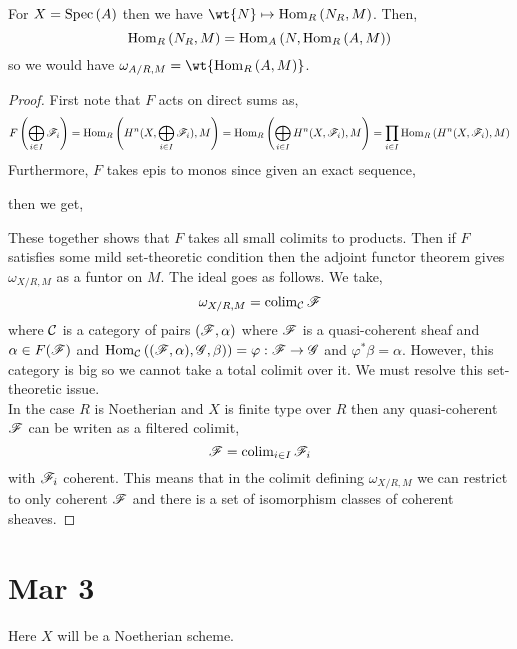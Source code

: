 \documentclass[12pt]{article}
\begin{document}
\begin{example}
For $X = \mathrm{Spec}\left( A \right)$ then we have $\wt{N} \mapsto \Hom{R}{N_R}{M}$. Then,
\[ \mathrm{Hom}_{R} \left( N_R, M \right) = \mathrm{Hom}_{A} \left( N, \mathrm{Hom}_{R} \left( A, M \right) \right) \]
so we would have $\omega_{A/R,M} = \wt{\Hom{R}{A}{M}}$. 
\end{example}

\begin{proof}
First note that $F$ acts on direct sums as,
\[ F \left( \bigoplus_{i \in I} \mathscr{F}_i \right) = \mathrm{Hom}_{R} \left( H^n(X, \bigoplus_{i \in I} \mathscr{F}_i), M \right) = \mathrm{Hom}_{R} \left( \bigoplus_{i \in I} H^n(X, \mathscr{F}_i), M \right) = \prod_{i \in I} \mathrm{Hom}_{R} \left( H^n(X, \mathscr{F}_i), M \right) \]
Furthermore, $F$ takes epis to monos since given an exact sequence,
\begin{center}
\end{center}
then we get,
\begin{center}
\end{center}
These together shows that $F$ takes all small colimits to products. Then if $F$ satisfies some mild set-theoretic condition then the adjoint functor theorem gives $\omega_{X/R, M}$ as a funtor on $M$. The ideal goes as follows. We take,
\[ \omega_{X/R,M} = \operatorname{\mathrm{colim}}_{\mathcal{C}} \mathscr{F} \]
where $\mathcal{C}$ is a category of pairs $(\mathscr{F}, \alpha)$ where $\mathscr{F}$ is a quasi-coherent sheaf and $\alpha \in F(\mathscr{F})$ and $\mathrm{Hom}_{\mathcal{C}} \left( (\mathscr{F}, \alpha), \mathscr{G}, \beta) \right) = \varphi : \mathscr{F} \to \mathscr{G}$ and $\varphi^* \beta = \alpha$. However, this category is big so we cannot take a total colimit over it. We must resolve this set-theoretic issue. 
\bigskip\\
In the case $R$ is Noetherian and $X$ is finite type over $R$ then any quasi-coherent $\mathscr{F}$ can be writen as a filtered colimit,
\[ \mathscr{F} = \operatorname{\mathrm{colim}}_{i \in I} \mathscr{F}_i \]
with $\mathscr{F}_i$ coherent. This means that in the colimit defining $\omega_{X/R,M}$ we can restrict to only coherent $\mathscr{F}$ and there is a set of isomorphism classes of coherent sheaves. 
\end{proof}

\section{Mar 3}

\begin{rmk}
Here $X$ will be a Noetherian scheme.
\end{rmk}
\end{document}
